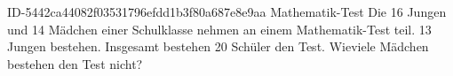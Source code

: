 \begin{exercise}
      {ID-5442ca44082f03531796efdd1b3f80a687e8e9aa}
      {Mathematik-Test}
  \ifproblem\problem
    Die 16 Jungen und 14 Mädchen einer Schulklasse nehmen an einem Mathematik-Test
    teil. 13 Jungen bestehen. Insgesamt bestehen 20 Schüler den Test. Wieviele
    Mädchen bestehen den Test nicht?
  \fi
\end{exercise}
